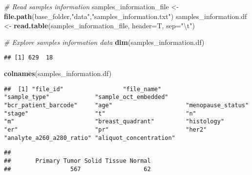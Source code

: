 \documentclass[]{book}
\newenvironment{Shaded}{\begin{snugshade}}{\end{snugshade}}
\newcommand{\KeywordTok}[1]{\textcolor[rgb]{0.13,0.29,0.53}{\textbf{#1}}}
\newcommand{\DataTypeTok}[1]{\textcolor[rgb]{0.13,0.29,0.53}{#1}}
\newcommand{\CharTok}[1]{\textcolor[rgb]{0.31,0.60,0.02}{#1}}
\newcommand{\StringTok}[1]{\textcolor[rgb]{0.31,0.60,0.02}{#1}}
\newcommand{\CommentTok}[1]{\textcolor[rgb]{0.56,0.35,0.01}{\textit{#1}}}
\newcommand{\OperatorTok}[1]{\textcolor[rgb]{0.81,0.36,0.00}{\textbf{#1}}}
\newcommand{\NormalTok}[1]{#1}
\begin{document}
\begin{Shaded}
\begin{Highlighting}[]
\CommentTok{# Read samples information}
\NormalTok{samples_information_file <-}\StringTok{ }\KeywordTok{file.path}\NormalTok{(base_folder,}\StringTok{"data"}\NormalTok{,}\StringTok{"samples_information.txt"}\NormalTok{)}
\NormalTok{samples_information.df <-}\StringTok{ }\KeywordTok{read.table}\NormalTok{(samples_information_file, }\DataTypeTok{header=}\NormalTok{T, }\DataTypeTok{sep=}\StringTok{"}\CharTok{\textbackslash{}t}\StringTok{"}\NormalTok{)}

\CommentTok{# Explore samples information data}
\KeywordTok{dim}\NormalTok{(samples_information.df)}
\end{Highlighting}
\end{Shaded}

\begin{verbatim}
## [1] 629  18
\end{verbatim}

\begin{Shaded}
\begin{Highlighting}[]
\KeywordTok{colnames}\NormalTok{(samples_information.df)}
\end{Highlighting}
\end{Shaded}

\begin{verbatim}
##  [1] "file_id"                 "file_name"               "sample_type"             "sample_oct_embedded"     "bcr_patient_barcode"     "age"                     "menopause_status"        "stage"                   "t"                       "n"                       "m"                       "breast_quadrant"         "histology"               "er"                      "pr"                      "her2"                    "analyte_a260_a280_ratio" "aliquot_concentration"
\end{verbatim}

\begin{Shaded}
\end{Shaded}

\begin{verbatim}
## 
##       Primary Tumor Solid Tissue Normal 
##                 567                  62
\end{verbatim}
\end{document}
